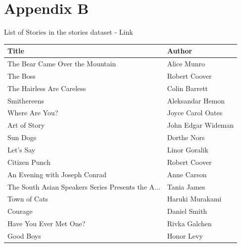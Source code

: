 \documentclass[11pt]{article}
\begin{document}
\section{Appendix B}
List of Stories in the stories dataset - Link
\begin{longtable}{l|l}
  \hline
  Title                                             & Author                     \\ \hline
  \endfirsthead
  \endhead
  The Bear Came Over the Mountain                   & Alice Munro                \\ \hline
  The Boss                                          & Robert Coover              \\ \hline
  The Hairless Are Careless                         & Colin Barrett              \\ \hline
  Smithereens                                       & Aleksandar Hemon           \\ \hline
  Where Are You?                                    & Joyce Carol Oates          \\ \hline
  Art of Story                                      & John Edgar Wideman         \\ \hline
  Sun Dogs                                          & Dorthe Nors                \\ \hline
  Let’s Say                                         & Linor Goralik              \\ \hline
  Citizen Punch                                     & Robert Coover              \\ \hline
  An Evening with Joseph Conrad                     & Anne Carson                \\ \hline
  The South Asian Speakers Series Presents the A... & Tania James                \\ \hline
  Town of Cats                                      & Haruki Murakami            \\ \hline
  Courage                                           & Daniel Smith               \\ \hline
  Have You Ever Met One?                            & Rivka Galchen              \\ \hline
  Good Boys                                         & Honor Levy                 \\ \hline

\end{longtable}
\end{document}
